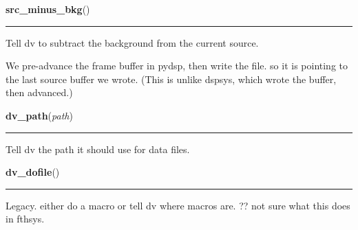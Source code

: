     \label{dv:src_minus_bkg}

    \vspace{0.5ex}

    \begin{boxedminipage}{\textwidth}

    \raggedright \textbf{src\_minus\_bkg}()

    \vspace{-1.5ex}

    \rule{\textwidth}{0.5\fboxrule}
    Tell dv to subtract the background from the current source.

    We pre-advance the frame buffer in pydsp, then write the file. so it is
    pointing to the last source buffer we wrote. (This is unlike dspsys, 
    which wrote the buffer, then advanced.)

    \vspace{1ex}

    \end{boxedminipage}

    \label{dv:dv_path}

    \vspace{0.5ex}

    \begin{boxedminipage}{\textwidth}

    \raggedright \textbf{dv\_path}(\textit{path})

    \vspace{-1.5ex}

    \rule{\textwidth}{0.5\fboxrule}
    Tell dv the path it should use for data files.

    \vspace{1ex}

    \end{boxedminipage}

    \label{dv:dv_dofile}

    \vspace{0.5ex}

    \begin{boxedminipage}{\textwidth}

    \raggedright \textbf{dv\_dofile}()

    \vspace{-1.5ex}

    \rule{\textwidth}{0.5\fboxrule}
    Legacy. either do a macro or tell dv where macros are. ?? not sure what
    this does in fthsys.

    \vspace{1ex}

    \end{boxedminipage}

